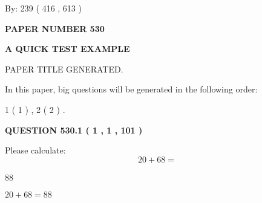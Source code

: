 \documentclass[12pt]{article}
\begin{document}
   
\hspace{1.0in} By: 
 239 ( 416 ,  613 )
   
   
   
   
\newpage 
\setcounter{page}{ 
   530001 } 
   
   
   
   
 {\textbf{ \Large{ PAPER NUMBER  530  }}}
   
   
\vspace{0.2in}
   
   
   
   
   
   
   
   
 \vspace{0.2in}
{\LARGE {\textbf{ A QUICK TEST EXAMPLE}}}
   
   
 PAPER TITLE GENERATED.
   
   
   
\vspace{0.2in}
   
In this paper, big questions will be generated in the following order: 
   
   
   1 ( 1 )
 ,
   2 ( 2 )
 .
  
\vspace{0.2in}
  
{\textbf{\Large{QUESTION
530.1 
 ( 1 , 1 , 101 )
}}}
  
  
 
Please calculate:
\begin{equation}
20 +  %
68 = \nonumber
\end{equation}
 
 
 
\noindent{}
 
 

88
 
 
\noindent{}
 
 

 
 
 
\noindent{}
 
 

$ %
20 +  %
68=   %
88$
 
 
\noindent{}
 
\end{document}

